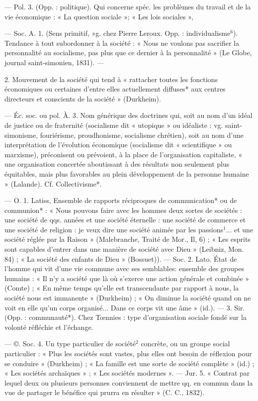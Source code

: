 \begin{itemize}[leftmargin=1cm, label=, itemsep=1pt]
— Pol. 3. (Opp. : politique). Qui
concerne spéc. les problèmes du travail et de la vie économique : « La
question sociale »; « Les lois sociales »,

 — Soc. A. 1. (Sens primitif, »g. chez Pierre Leroux. Opp. :
individualisme$^6$). Tendance à tout
subordonner à la société : « Nous ne
voulons pas sacrifier la personnalité
au socialisme, pas plus que ce dernier à la personnalité » (Le Globe,
journal saint-simonien, 1831). —

2. Mouvement de la société qui tend
à « rattacher toutes les fonctions
économiques ou certaines d’entre
elles actuellement diffuses* aux
centres directeurs et conscients de
la société » (Durkheim).

— Éc. soc. ou pol. À. 3. Nom
générique des doctrines qui, soit au
nom d’un idéal de justice ou de fraternité (socialisme dit « utopique »
ou idéaliste : vg. saint-simonisme,
fouriérisme, proudhonisme, socialisme chrétien), soit au nom d’une
interprétation de l’évolution économique (socialisme dit « scientifique »
ou marxisme), préconisent ou prévoient, à la place de l’organisation
capitaliste, « une organisation concertée aboutissant à des résultats
non seulement plus équitables, mais
plus favorables au plein développement de la personne humaine » (Lalande). Cf. Collectivisme*.

 — O. 1. Latiss, Ensemble de
rapports réciproques de communication* ou de communion* :
« Nous pouvons faire avec les
hommes deux sortes de sociétés :
une société de qqs. années et une
société éternelle : une société de
commerce et une société de religion : je veux dire une société animée par les passions$^1$... et une société réglée par la Raison » (Malebranche, Traité de Mor., Il, 6) ;
« Les esprits sont capables d'entrer
dans une manière de société avec
Dieu » (Leibniz, Mon. 84) ; « La
société des enfants de Dieu » (Bossuet)). — Soc. 2. Lato. État de
l’homme qui vit d'une vie commune avec ses semblables: ensemble
des groupes humains : « Il n’y a
société que là où s’exerce une action
générale et combinée » (Comte) ;
« En même temps qu’elle est transcendante par rapport à nous, la
société nous est immanente » (Durkheim) ; « On diminue la société
quand on ne voit en elle qu'un
corps organisé... Dans ce corps vit
une âme » (id.). — 3. Sir. (Opp. :
communauté*). Chez Tœnnies : type
d'organisation sociale fondé sur la
volonté réfléchie et l’échange.

— ©. Soc. 4. Un type particulier
de société$^2$ concrète, ou un groupe
social particulier : « Plus les sociétés
sont vastes, plus elles ont besoin de
réflexion pour se conduire » (Durkheim) ; « La famille est une sorte
de société complète » (id.) ; « Les
sociétés archaïques » ; « Les sociétés
modernes ». — Jur. 5. « Contrat par
lequel deux ou plusieurs personnes
conviennent de mettre qq. en
commun dans la vue de partager le
bénéfice qui prurra en résulter »
(C. C., 1832).


\end{itemize}
